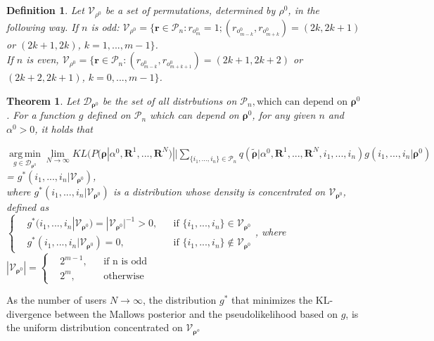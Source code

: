 \documentclass[11pt, oneside]{article}   	%
\newtheorem{theorem}{Theorem}[subsection]
\newtheorem{mydef}{Definition}
\begin{document}
\subsection{ }
\begin{mydef}{
Let $\mathcal{V}_{\rho^0}$ be a set of permutations, determined by $\rho^0$, in the following way. If $n$ is odd:
 $\mathcal{V}_{\rho^0} = \{\bm{r}\in \mathcal{P}_n: r_{o^0_m} = 1; (r_{o^0_{m-k}},r_{o^0_{m+k}}) = (2k, 2k+1) $ or $ (2k+1, 2k)$, $k = 1, ..., m-1\}$. \\
 If $n$ is even,  $\mathcal{V}_{\rho^0} = \{\bm{r}\in \mathcal{P}_n:(r_{o^0_{m-k}},r_{o^0_{m+k+1}}) = (2k+1, 2k+2) $ or $ (2k+2, 2k+1)$, $k = 0, ..., m-1\}$.

}
\end{mydef}
\begin{theorem}\label{theorem:V}
Let	$\mathcal{D}_{\bm{\rho}^0}$ be the set of all distrbutions on $\mathcal{P}_n, \text{which can depend on } \bm{\rho}^0$. For a function $g$ defined on $\mathcal{P}_n$ which can depend on $\bm{\rho}^0$, for any given $n$ and $\alpha^0 > 0$, it holds that

 $\operatorname*{arg\,min}\limits_{g\in\mathcal{D}_{\bm{\rho}^0}}\lim\limits_{N \rightarrow \infty} KL (P(\bm{\rho}|\alpha^0, \bm{R}^1, ...,\bm{R}^N ) || \sum\limits_{\{i_1,..., i_n\} \in \mathcal{P}_n} q (\tilde{\bm{\rho}}|\alpha^0, \bm{R}^1,..., \bm{R}^N, i_1,...,i_n) g(i_1,...,i_n|\bm{\rho}^0)$ \\
= $g^*(i_1,...,i_n|\mathcal{V}_{{\bm{\rho}}^0})$, \\where
		$g^*(i_1, ..., i_n | \mathcal{V}_{\bm{\rho}^0})$ is a distribution whose density is concentrated on $\mathcal{V}_{\bm{\rho}^0}$, defined as \\
		  $
		\left \{
		\begin{aligned}
		&g^*(i_1, ..., i_n | \mathcal{V}_{\bm{\rho}^0}) = |\mathcal{V}_{\bm{\rho}^0}|^{-1}>0 , && \text{if } \{i_1,...,i_n\}\in \mathcal{V}_{\bm{\rho}^0}\\
		&g^*(i_1, ..., i_n | \mathcal{V}_{\bm{\rho}^0}) = 0 , && \text{if } \{i_1,...,i_n\}\notin \mathcal{V}_{\bm{\rho}^0}
		\end{aligned} \right.
		$, where $|\mathcal{V}_{\bm{\rho}^0}|
			= \left \{
			\begin{aligned}
			&2^{m-1}, && \text{if n is odd} \\
			&2^m, && \text{otherwise}
			\end{aligned} \right.
			$

\end{theorem}
As the number of users $N \rightarrow \infty$, the distribution $g^*$ that minimizes the KL-divergence between the Mallows posterior and the pseudolikelihood based on $g$, is the uniform distribution concentrated on $\mathcal{V}_{\bm{\rho}^o}$
\end{document}
